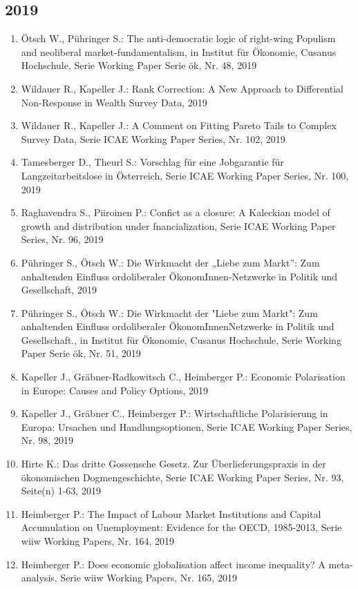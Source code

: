 \subsection*{2019}
\begin{enumerate}
    	 \item Ötsch W., Pühringer S.: The anti-democratic logic of right-wing Populism and neoliberal market-fundamentalism, in Institut für Ökonomie, Cusanus Hochschule, Serie Working Paper Serie ök, Nr. 48, 2019
	 \item Wildauer R., Kapeller J.: Rank Correction: A New Approach to Differential Non-Response in Wealth Survey Data, 2019
	 \item Wildauer R., Kapeller J.: A Comment on Fitting Pareto Tails to Complex Survey Data, Serie ICAE Working Paper Series, Nr. 102, 2019
	 \item Tamesberger D., Theurl S.: Vorschlag für eine Jobgarantie für Langzeitarbeitslose in Österreich, Serie ICAE Working Paper Series, Nr. 100, 2019
	 \item Raghavendra S., Piiroinen P.: Confict as a closure: A Kaleckian model of growth and distribution under fnancialization, Serie ICAE Working Paper Series, Nr. 96, 2019
	 \item Pühringer S., Ötsch W.: Die Wirkmacht der „Liebe zum Markt”: Zum anhaltenden Einfluss ordoliberaler ÖkonomInnen-Netzwerke in Politik und Gesellschaft, 2019
	 \item Pühringer S., Ötsch W.: Die Wirkmacht der "Liebe zum Markt": Zum anhaltenden Einfluss ordoliberaler ÖkonomInnenNetzwerke in Politik und Gesellschaft., in Institut für Ökonomie, Cusanus Hochschule, Serie Working Paper Serie ök, Nr. 51, 2019
	 \item Kapeller J., Gräbner-Radkowitsch C., Heimberger P.: Economic Polarisation in Europe: Causes and Policy Options, 2019
	 \item Kapeller J., Gräbner C., Heimberger P.: Wirtschaftliche Polarisierung in Europa: Ursachen und Handlungsoptionen, Serie ICAE Working Paper Series, Nr. 98, 2019
	 \item Hirte K.: Das dritte Gossensche Gesetz. Zur Überlieferungspraxis in der ökonomischen Dogmengeschichte, Serie ICAE Working Paper Series, Nr. 93, Seite(n) 1-63, 2019
	 \item Heimberger P.: The Impact of Labour Market Institutions and Capital Accumulation on Unemployment: Evidence for the OECD, 1985-2013, Serie wiiw Working Papers, Nr. 164, 2019
	 \item Heimberger P.: Does economic globalisation affect income inequality? A meta-analysis, Serie wiiw Working Papers, Nr. 165, 2019

\end{enumerate}
